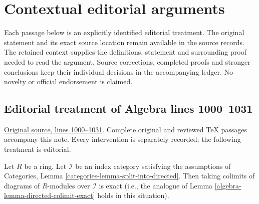 \section{Contextual editorial arguments}

Each passage below is an explicitly identified editorial treatment. The original statement and its exact source location remain available in the source records. The retained context supplies the definitions, statement and surrounding proof needed to read the argument. Source corrections, completed proofs and stronger conclusions keep their individual decisions in the accompanying ledger. No novelty or official endorsement is claimed.

\subsection{Editorial treatment of Algebra lines 1000--1031}

\hypertarget{algebra-context-001}{}

\noindent\href{https://github.com/stacks/stacks-project/blob/a04446e57ec1fbc252a871afcec7752fb2807b14/algebra.tex\#L1000}{Original source, lines 1000--1031}. Complete original and reviewed TeX passages accompany this note. Every intervention is separately recorded; the following treatment is editorial.


\begin{lemma}
\label{editorial-source-lemma-almost-directed-colimit-exact}
Let $R$ be a ring. Let $\mathcal{I}$ be an index category satisfying the assumptions of
Categories, Lemma \ref{categories-lemma-split-into-directed}.
Then taking colimits of diagrams of $R$-modules over $\mathcal{I}$
is exact (i.e., the analogue of
Lemma \ref{algebra-lemma-directed-colimit-exact}
holds in this situation).
\end{lemma}

